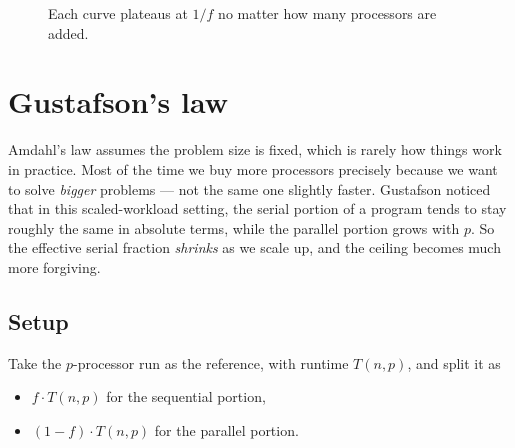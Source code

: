 \begin{figure}[h]
\centering
{}
\caption{Each curve plateaus at $1/f$ no matter how many processors are added.}
\label{fig:amdahl-curves}
\end{figure}

\section{Gustafson's law}

Amdahl's law assumes the problem size is fixed, which is rarely how things
work in practice. Most of the time we buy more processors precisely because
we want to solve \emph{bigger} problems --- not the same one slightly
faster. Gustafson noticed that in this scaled-workload setting, the serial
portion of a program tends to stay roughly the same in absolute terms,
while the parallel portion grows with $p$. So the effective serial
fraction \emph{shrinks} as we scale up, and the ceiling becomes much more
forgiving.

\subsection{Setup}

Take the $p$-processor run as the reference, with runtime $T(n,p)$, and
split it as
\begin{itemize}
  \item $f \cdot T(n,p)$ for the sequential portion,
  \item $(1-f)\cdot T(n,p)$ for the parallel portion.
\end{itemize}


